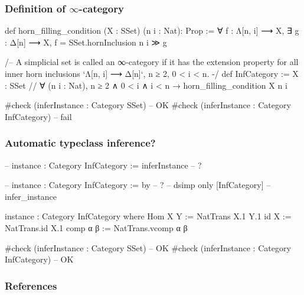 \documentclass{beamer}
\begin{document}

\begin{frame}[fragile] %
\frametitle{Definition of $\infty$-category}
  \begin{leancode}
  def horn_filling_condition (X : SSet) (n i : Nat): Prop :=
    ∀ f : Λ[n, i] ⟶ X, ∃ g : Δ[n] ⟶ X,
    f = SSet.hornInclusion n i ≫ g
  
  /-- A simplicial set is called an ∞-category
  if it has the extension property for all inner horn inclusions
  `Λ[n, i] ⟶ Δ[n]`, n ≥ 2, 0 < i < n. -/
  def InfCategory := {X : SSet //
    ∀ (n i : Nat),
    n ≥ 2 ∧ 0 < i ∧ i < n → horn_filling_condition X n i}
    
  #check (inferInstance : Category SSet) -- OK
  #check (inferInstance : Category InfCategory) -- fail
  \end{leancode}
\end{frame}

\begin{frame}[fragile] %
\frametitle{Automatic typeclass inference?}
  \begin{leancode}
  -- instance : Category InfCategory := inferInstance -- ?
  
  -- instance : Category InfCategory := by -- ?
  --   dsimp only [InfCategory]
  --   infer_instance
  
  instance : Category InfCategory where
    Hom X Y := NatTrans X.1 Y.1
    id X := NatTrans.id X.1
    comp α β := NatTrans.vcomp α β

  #check (inferInstance : Category SSet) -- OK
  #check (inferInstance : Category InfCategory) -- OK
  \end{leancode}
\end{frame}


\begin{frame}[allowframebreaks]
	\nocite{*}
       \frametitle{References}
\end{frame}


\end{document}
